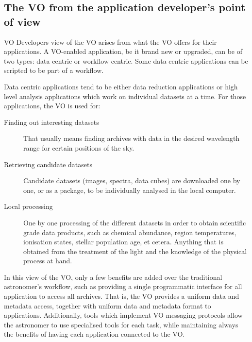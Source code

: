 	\subsection{The VO from the application developer's point of view}
	\label{ssub:the_vo_for_the_application_developer}

		VO Developers view of the VO arises from what the VO offers
		for their applications. A VO-enabled application, be it
		brand new or upgraded, can be of two types: data centric or
		workflow centric. Some data centric applications can be
		scripted to be part of a workflow.
		
		 Data centric applications tend to be either data reduction
		applications or high level analysis applications which work
		on individual datasets at a time. For those applications,
		the VO is used for:
		
		\begin{description}
		
			\item[Finding out interesting datasets] That usually
		    means finding archives with data in the desired
		    wavelength range for certain positions of the sky.
			
			 \item[Retrieving candidate datasets] Candidate
		    datasets (images, spectra, data cubes) are downloaded
		    one by one, or as a package, to be individually
		    analysed in the local computer.
			
			 \item[Local processing] One by one processing of the
		    different datasets in order to obtain scientific grade
		    data products, such as chemical abundance, region
		    temperatures, ionisation states, stellar population
		    age, et cetera. Anything that is obtained from the
		    treatment of the light and the knowledge of the
		    physical process at hand.
		
		\end{description}

		 In this view of the VO, only a few benefits are added over
		the traditional astronomer's workflow, such as providing a
		single programmatic interface for all application to access
		all archives. That is, the VO provides a uniform data and
		metadata access, together with uniform data and metadata
		format to applications. Additionally, tools which implement
		VO messaging protocols allow the astronomer to use
		specialised tools for each task, while maintaining always
		the benefits of having each application connected to the
		VO.
		
